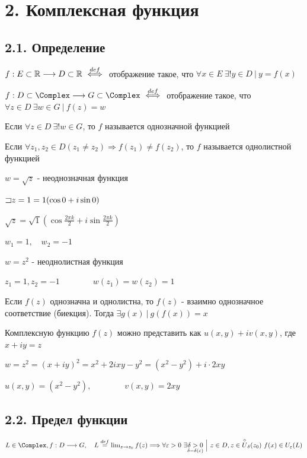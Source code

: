 \documentclass[12pt]{article}
\begin{document}
\section{2. Комплексная функция}

\subsection{2.1. Определение}

\Mem $f : E \subset \mathbb{R} \longrightarrow D \subset \mathbb{R} \ \overset{def}{\Longleftrightarrow} \ $ отображение такое, 
что $\forall x \in E \ \exists! y \in D \ | \ y = f(x)$

\Def $f : D \subset \Complex \longrightarrow G \subset \Complex \ \overset{def}{\Longleftrightarrow} \ $ отображение такое, 
что $\forall z \in D \ \exists w \in G \ | \ f(z) = w$

\Defs Если $\forall z \in D \ \exists! w \in G$, то $f$ называется однозначной функцией

\Defs Если $\forall z_1, z_2 \in D (z_1 \neq z_2) \Longrightarrow f(z_1) \neq f(z_2)$, 
то $f$ называется однолистной функцией

 $w = \sqrt{z}$ - неоднозначная функция

$\mathord{\sqsupset} z = 1 = 1 (\cos 0 + i \sin 0)$

$\sqrt{z} = \sqrt{1} \left(\cos \frac{2\pi k}{2} + i \sin \frac{2\pi k}{2}\right)$

$w_1 = 1, \quad w_2 = -1$

 $w = z^2$ - неоднолистная функция

$z_1 = 1, z_2 = -1 \qquad\qquad w(z_1) = w(z_2) = 1$

\Nota Если $f(z)$ однозначна и однолистна, то $f(z)$ - взаимно однозначное соответствие (биекция). Тогда $\exists g(x) \ | \ g(f(x)) = x$

Комплексную функцию $f(z)$ можно представить как $u(x, y) + i v(x, y)$, где $x + iy = z$

\Ex $w = z^2 = (x + iy)^2 = x^2 + 2ixy - y^2 = (x^2 - y^2) + i \cdot 2xy$

$u(x, y) = (x^2 - y^2), \qquad\qquad v(x, y) = 2xy$

\subsection{2.2. Предел функции}

\Def $L \in \Complex, f : D \longrightarrow G, \quad L \overset{def}{=} \lim_{z \to z_0} f(z) \Longrightarrow
\forall \varepsilon > 0 \ \exists \underset{\delta = \delta(\varepsilon)}{\delta > 0} \ \Big| \ z \in D, z \in \overset{\circ}{U}_\delta(z_0) \ f(x) \in U_\varepsilon(L)$
\end{document}

